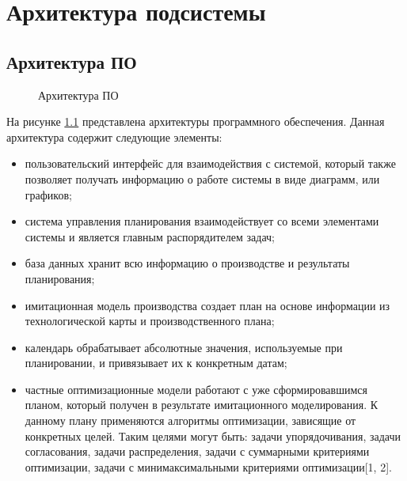 \chapter{Архитектура подсистемы}

\section{Архитектура ПО}

\begin{figure}[H]
    \caption{Архитектура ПО}
    \label{ris:arh1}
\end{figure}

На рисунке \ref{ris:arh1} представлена архитектуры программного обеспечения. Данная архитектура содержит следующие элементы:

\begin{itemize}
    \item пользовательский интерфейс для взаимодействия с системой, который также позволяет получать информацию о работе системы в виде диаграмм, или графиков; 
    \item система управления планирования взаимодействует со всеми элементами системы и является главным распорядителем задач;
    \item база данных хранит всю информацию о производстве и результаты планирования; 
    \item имитационная модель производства создает план на основе информации из технологической карты и производственного плана;
    \item календарь обрабатывает абсолютные значения, используемые при планировании, и привязывает их к конкретным датам;
    \item частные оптимизационные модели работают с уже сформировавшимся планом, который получен в результате имитационного моделирования. К данному плану применяются алгоритмы оптимизации, зависящие от конкретных целей. Таким целями могут быть: задачи упорядочивания, задачи согласования, задачи распределения, задачи с суммарными критериями оптимизации, задачи с минимаксимальными критериями оптимизации[1, 2].
\end{itemize}

